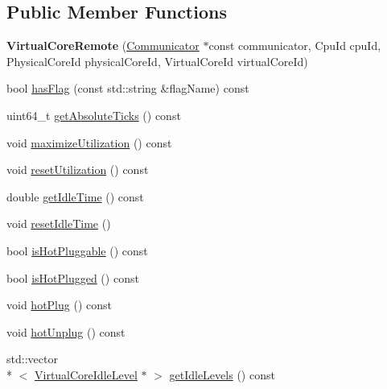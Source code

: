 \subsection*{Public Member Functions}
\begin{DoxyCompactItemize}
\item 
\hypertarget{classmammut_1_1topology_1_1VirtualCoreRemote_a60d99247cb0af8fef314068d22e2e8fa}{{\bfseries Virtual\-Core\-Remote} (\hyperlink{classmammut_1_1Communicator}{Communicator} $\ast$const communicator, Cpu\-Id cpu\-Id, Physical\-Core\-Id physical\-Core\-Id, Virtual\-Core\-Id virtual\-Core\-Id)}\label{classmammut_1_1topology_1_1VirtualCoreRemote_a60d99247cb0af8fef314068d22e2e8fa}

\item 
bool \hyperlink{classmammut_1_1topology_1_1VirtualCoreRemote_a0968fac0f22747b5663741673225999e}{has\-Flag} (const std\-::string \&flag\-Name) const 
\item 
uint64\-\_\-t \hyperlink{classmammut_1_1topology_1_1VirtualCoreRemote_a2f5a7e3738b84dd04436167eb7ef2f75}{get\-Absolute\-Ticks} () const 
\item 
void \hyperlink{classmammut_1_1topology_1_1VirtualCoreRemote_abc026a4e9ae7db3c0d8373c520b4312d}{maximize\-Utilization} () const 
\item 
void \hyperlink{classmammut_1_1topology_1_1VirtualCoreRemote_a43ea3102cdebec0ce6991b5638e3c4e2}{reset\-Utilization} () const 
\item 
double \hyperlink{classmammut_1_1topology_1_1VirtualCoreRemote_a839fc0934e9aa994deb5538829299ed6}{get\-Idle\-Time} () const 
\item 
void \hyperlink{classmammut_1_1topology_1_1VirtualCoreRemote_a9319506b3bb0e2e457fd6f8c3376efa9}{reset\-Idle\-Time} ()
\item 
bool \hyperlink{classmammut_1_1topology_1_1VirtualCoreRemote_a8675d2a4fc13d470e427f1e3a55d41c8}{is\-Hot\-Pluggable} () const 
\item 
bool \hyperlink{classmammut_1_1topology_1_1VirtualCoreRemote_a8242f18df08037f47886ecc42c0b451b}{is\-Hot\-Plugged} () const 
\item 
void \hyperlink{classmammut_1_1topology_1_1VirtualCoreRemote_a763728a004cb02e6263232ddda0b77b4}{hot\-Plug} () const 
\item 
void \hyperlink{classmammut_1_1topology_1_1VirtualCoreRemote_a0a6a44ac33ecdaeb00fc28f0f2a568a9}{hot\-Unplug} () const 
\item 
std\-::vector\\*
$<$ \hyperlink{classmammut_1_1topology_1_1VirtualCoreIdleLevel}{Virtual\-Core\-Idle\-Level} $\ast$ $>$ \hyperlink{classmammut_1_1topology_1_1VirtualCoreRemote_aaad295d5f06de21eaaff941e840de3df}{get\-Idle\-Levels} () const 
\end{DoxyCompactItemize}
